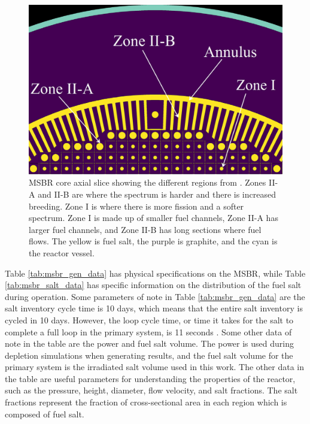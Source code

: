 \begin{figure}[H]
  \centering
  \includegraphics[scale=0.25]{images/msbr_ryk_1.PNG}
  \caption{MSBR core axial slice showing the different regions from \cite{rykhlevskii_modeling_2019}. Zones II-A and II-B are where the spectrum is harder and there is increased breeding. Zone I is where there is more fission and a softer spectrum. Zone I is made up of smaller fuel channels, Zone II-A has larger fuel channels, and Zone II-B has long sections where fuel flows. The yellow is fuel salt, the purple is graphite, and the cyan is the reactor vessel.}
   \label{fig:msbr_ryklev}
\end{figure}

Table \ref{tab:msbr_gen_data} has physical specifications on the MSBR, while Table \ref{tab:msbr_salt_data} has specific information on the distribution of the fuel salt during operation. Some parameters of note in Table \ref{tab:msbr_gen_data} are the salt inventory cycle time is 10 days, which means that the entire salt inventory is cycled in 10 days. However, the loop cycle time, or time it takes for the salt to complete a full loop in the primary system, is 11 seconds \cite{robertson_conceptual_1971}. Some other data of note in the table are the power and fuel salt volume. The power is used during depletion simulations when generating results, and the fuel salt volume for the primary system is the irradiated salt volume used in this work. The other data in the table are useful parameters for understanding the properties of the reactor, such as the pressure, height, diameter, flow velocity, and salt fractions. The salt fractions represent the fraction of cross-sectional area in each region which is composed of fuel salt.

